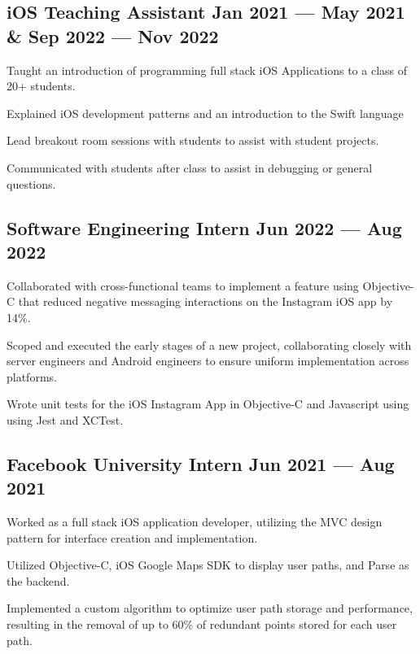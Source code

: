 
\subsection{{iOS Teaching Assistant \hfill Jan 2021 --- May 2021 \& Sep 2022 --- Nov 2022}}
\begin{zitemize}
\item Taught an introduction of programming full stack iOS Applications to a class of 20+ students.
\item Explained iOS development patterns and an introduction to the Swift language
\item Lead breakout room sessions with students to assist with student projects.
\item Communicated with students after class to assist in debugging or general questions.
\end{zitemize}


\subsection{{Software Engineering Intern \hfill Jun 2022 --- Aug 2022}}
\begin{zitemize}
\item Collaborated with cross-functional teams to implement a feature using Objective-C that reduced negative messaging interactions on the Instagram iOS app by 14\%.
\item Scoped and executed the early stages of a new project, collaborating closely with server engineers and Android engineers to ensure uniform implementation across platforms.
\item Wrote unit tests for the iOS Instagram App in Objective-C and Javascript using using Jest and XCTest.
\end{zitemize}

\subsection{{Facebook University Intern \hfill Jun 2021 --- Aug 2021}}
\begin{zitemize}
\item Worked as a full stack iOS application developer, utilizing the MVC design pattern for interface creation and implementation.
\item Utilized Objective-C, iOS Google Maps SDK to display user paths, and Parse as the backend.
\item Implemented a custom algorithm to optimize user path storage and performance, resulting in the removal of up to 60\% of redundant points stored for each user path.
\end{zitemize}

